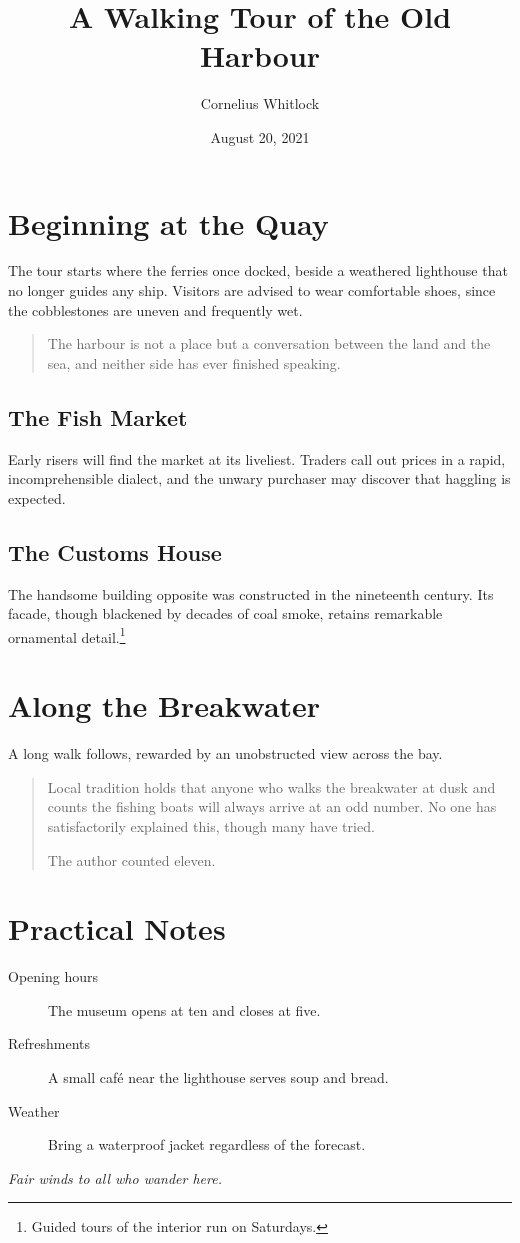 \documentclass[12pt,letterpaper]{article}
\title{A Walking Tour of the Old Harbour}
\author{Cornelius Whitlock}
\date{August 20, 2021}
\begin{document}
\maketitle

\section{Beginning at the Quay}
The tour starts where the ferries once docked, beside a weathered
lighthouse that no longer guides any ship. Visitors are advised to wear
comfortable shoes, since the cobblestones are uneven and frequently wet.

\begin{quote}
The harbour is not a place but a conversation between the land and the sea,
and neither side has ever finished speaking.
\end{quote}

\subsection{The Fish Market}
Early risers will find the market at its liveliest. Traders call out prices
in a rapid, incomprehensible dialect, and the unwary purchaser may discover
that haggling is expected.

\subsection{The Customs House}
The handsome building opposite was constructed in the nineteenth century.
Its facade, though blackened by decades of coal smoke, retains remarkable
ornamental detail.\footnote{Guided tours of the interior run on Saturdays.}

\section{Along the Breakwater}
A long walk follows, rewarded by an unobstructed view across the bay.

\begin{quotation}
Local tradition holds that anyone who walks the breakwater at dusk and
counts the fishing boats will always arrive at an odd number. No one has
satisfactorily explained this, though many have tried.

The author counted eleven.
\end{quotation}

\section*{Practical Notes}
\begin{description}
\item[Opening hours] The museum opens at ten and closes at five.
\item[Refreshments] A small caf\'e near the lighthouse serves soup and bread.
\item[Weather] Bring a waterproof jacket regardless of the forecast.
\end{description}

\vspace{1cm}
\begin{center}
\emph{Fair winds to all who wander here.}
\end{center}
\end{document}
